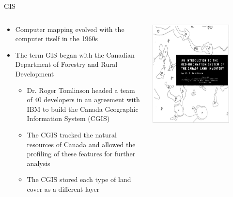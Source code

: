 \documentclass[notes, aspectratio=1610]{beamer}
\begin{document}
\begin{frame}{GIS}{}
	\begin{columns}
	\begin{column}{0.5\textwidth}
		\begin{itemize}
		\item 
		Computer mapping evolved with the computer itself in the 1960s
		\item 
		The term GIS began with the Canadian Department of Forestry 
		and Rural Development
			\begin{itemize}
				\item 
				Dr. Roger Tomlinson headed a team of 40 
				developers in an agreement with IBM to build the 
				Canada Geographic Information System (CGIS)
			        \item 
				The CGIS tracked the natural resources of Canada 
				and allowed the profiling of these features for further 
				analysis
			      	\item 
				The CGIS stored each type of land cover as a different 
				layer
			\end{itemize}
		\end{itemize}
	\end{column}
	\begin{column}{0.5\textwidth}
		\centering
		\includegraphics[width=0.8\textwidth]{images/canada_gis.jpeg}
	\end{column}
	\end{columns}
\end{frame}
\end{document}
